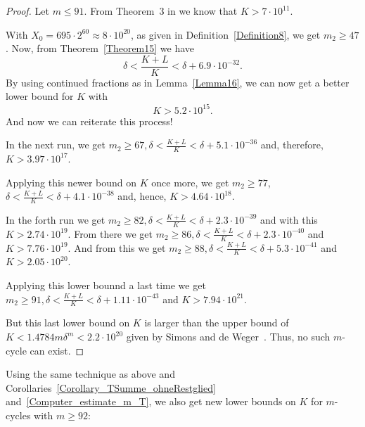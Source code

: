 \documentclass[12pt,reqno]{article}
\begin{document}
\begin{proof}
Let $m\leq 91$. From Theorem~3 in \cite{SW-www} we know that $K>7\cdot 10^{11}$. 

With $X_0=695\cdot 2^{60}\approx 8\cdot10^{20}$, as given in Definition~\ref{Definition8}, we get $m_2\geq 47$. Now, from Theorem~\ref{Theorem15} we have
\[\delta < \frac{K+L}{K} < \delta + 6.9\cdot 10^{-32}.\]
By using continued fractions as in Lemma~\ref{Lemma16}, we can now get a better lower bound for $K$ with
\[K>5.2\cdot 10^{15}.\]
And now we can reiterate this process! 

In the next run, we get $m_2\geq 67, \delta<\tfrac{K+L}{K}<\delta+5.1\cdot 10^{-36}$ and, therefore, $K>3.97\cdot 10^{17}$.

Applying this newer bound on $K$ once more, we get $m_2\geq 77$, \linebreak $\delta<\tfrac{K+L}{K}<\delta+4.1\cdot 10^{-38}$ and, hence, $K>4.64\cdot 10^{18}$. 

In the forth run we get $m_2\geq 82, \delta<\tfrac{K+L}{K}<\delta+2.3\cdot 10^{-39}$ and with this $K>2.74\cdot 10^{19}$. From there we get $m_2\geq 86, \delta<\tfrac{K+L}{K}<\delta+2.3\cdot 10^{-40}$ and $K>7.76\cdot 10^{19}$.  And from this we get $m_2\geq 88, \delta<\tfrac{K+L}{K}<\delta+5.3\cdot 10^{-41}$ and  $K>2.05\cdot 10^{20}$.

Applying this lower bounnd a last time we get $m_2\geq 91, \delta<\tfrac{K+L}{K}<\delta+1.11\cdot 10^{-43}$ and  $K>7.94\cdot 10^{21}$.

But this last lower bound on $K$ is larger than the upper bound of $K<1.4784 m\delta^m<2.2\cdot10^{20}$ given by Simons and de Weger~\cite{SW-www}. Thus, no such $m$-cycle can exist.
\end{proof}

Using the same technique as above and Corollaries~\ref{Corollary_TSumme_ohneRestglied} and~\ref{Computer_estimate_m_T}, we also get new lower bounds on $K$ for $m$-cycles with $m\geq 92$:
\end{document}
